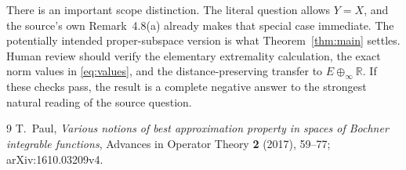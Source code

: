 \documentclass[11pt,a4paper]{article}
\newcommand{\R}{\mathbb R}
\begin{document}
There is an important scope distinction. The literal question allows $Y=X$,
and the source's own Remark~4.8(a) already makes that special case immediate.
The potentially intended proper-subspace version is what
Theorem~\ref{thm:main} settles. Human review should verify the elementary
extremality calculation, the exact norm values in \eqref{eq:values}, and the
distance-preserving transfer to $E\oplus_\infty\R$. If these checks pass, the
result is a complete negative answer to the strongest natural reading of the
source question.

\begin{thebibliography}{9}
T.~Paul,
\emph{Various notions of best approximation property in spaces of Bochner
integrable functions}, Advances in Operator Theory \textbf{2} (2017), 59--77;
arXiv:1610.03209v4.
\end{thebibliography}
\end{document}
